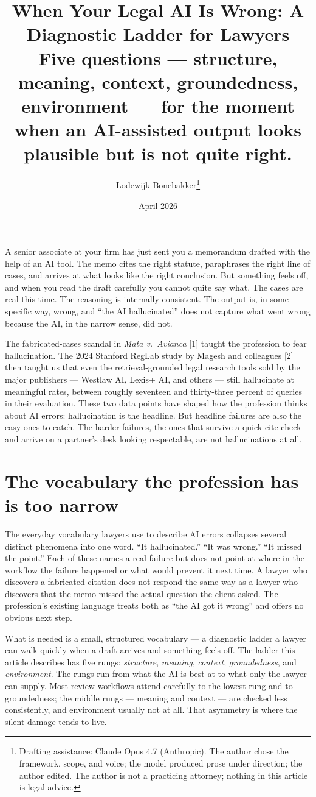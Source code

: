 \documentclass[11pt,a4paper]{article}
\title{When Your Legal AI Is Wrong: A Diagnostic Ladder for
Lawyers\\[0.3em]
\large Five questions --- structure, meaning, context,
groundedness, environment --- for the moment when an AI-assisted
output looks plausible but is not quite right.}
\author{Lodewijk Bonebakker\thanks{Drafting assistance: Claude
Opus 4.7 (Anthropic). The author chose the framework, scope, and
voice; the model produced prose under direction; the author
edited. The author is not a practicing attorney; nothing in this
article is legal advice.}}
\date{April 2026}
\begin{document}
\maketitle

\noindent
A senior associate at your firm has just sent you a memorandum
drafted with the help of an AI tool. The memo cites the right
statute, paraphrases the right line of cases, and arrives at what
looks like the right conclusion. But something feels off, and when
you read the draft carefully you cannot quite say what. The cases
are real this time. The reasoning is internally consistent. The
output is, in some specific way, wrong, and ``the AI hallucinated''
does not capture what went wrong because the AI, in the narrow
sense, did not.

The fabricated-cases scandal in \emph{Mata v.~Avianca} [1] taught
the profession to fear hallucination. The 2024 Stanford RegLab
study by Magesh and colleagues [2] then taught us that even the
retrieval-grounded legal research tools sold by the major
publishers --- Westlaw AI, Lexis+ AI, and others --- still
hallucinate at meaningful rates, between roughly seventeen and
thirty-three percent of queries in their evaluation. These two
data points have shaped how the profession thinks about AI errors:
hallucination is the headline. But headline failures are also the
easy ones to catch. The harder failures, the ones that survive a
quick cite-check and arrive on a partner's desk looking respectable,
are not hallucinations at all.

\section*{The vocabulary the profession has is too narrow}

The everyday vocabulary lawyers use to describe AI errors collapses
several distinct phenomena into one word. ``It hallucinated.''
``It was wrong.'' ``It missed the point.'' Each of these names a
real failure but does not point at where in the workflow the
failure happened or what would prevent it next time. A lawyer who
discovers a fabricated citation does not respond the same way as a
lawyer who discovers that the memo missed the actual question the
client asked. The profession's existing language treats both as
``the AI got it wrong'' and offers no obvious next step.

What is needed is a small, structured vocabulary --- a diagnostic
ladder a lawyer can walk quickly when a draft arrives and
something feels off. The ladder this article describes has five
rungs: \emph{structure}, \emph{meaning}, \emph{context},
\emph{groundedness}, and \emph{environment}. The rungs run from
what the AI is best at to what only the lawyer can supply. Most
review workflows attend carefully to the lowest rung and to
groundedness; the middle rungs --- meaning and context --- are
checked less consistently, and environment usually not at all.
That asymmetry is where the silent damage tends to live.
\end{document}

